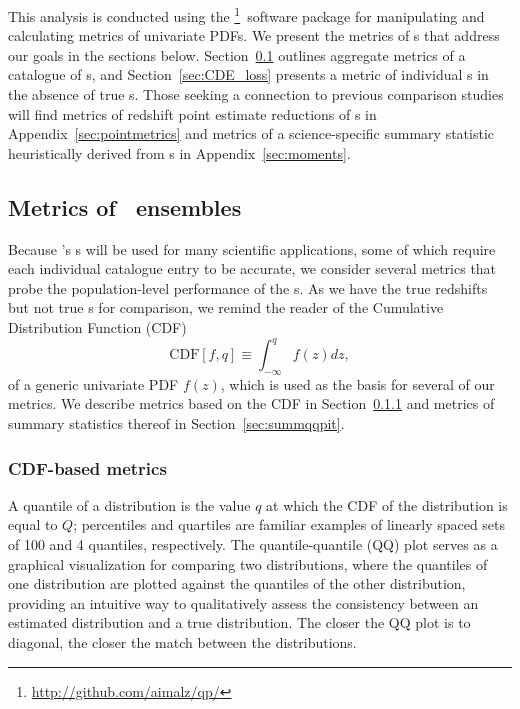 This analysis is conducted using the \qp\footnote{\url{http://github.com/aimalz/qp/}}\ software package \citep{Malz:qp} for manipulating and calculating metrics of univariate PDFs.
We present the metrics of \pzpdf s that address our goals in the sections below.
Section~\ref{sec:qualmet} outlines aggregate metrics of a catalogue of \pzpdf s, and Section~\ref{sec:CDE_loss} presents a metric of individual \pzpdf s in the absence of true \pzpdf s.
Those seeking a connection to previous comparison studies will find metrics of redshift point estimate reductions of \pzpdf s in Appendix~\ref{sec:pointmetrics} and metrics of a science-specific summary statistic heuristically derived from \pzpdf s in Appendix~\ref{sec:moments}.

\subsection{Metrics of \pzpdf \ ensembles}
\label{sec:qualmet}

Because \lsst's \pzpdf s will be used for many scientific applications, some of which require each individual catalogue entry to be accurate, we consider several metrics that probe the population-level performance of the \pzpdf s.
As we have the true redshifts but not true \pzpdf s for comparison, we remind the reader of the Cumulative Distribution Function (CDF)
\begin{equation}
  \label{eq:cdf}
  \mathrm{CDF}[f, q] \equiv \int_{-\infty}^{q} f(z) dz,
\end{equation}
of a generic univariate PDF $f(z)$, which is used as the basis for several of our metrics.
We describe metrics based on the CDF in Section~\ref{sec:qqpit} and metrics of summary statistics thereof in Section~\ref{sec:summqqpit}.

\subsubsection{CDF-based metrics}
\label{sec:qqpit}

A quantile of a distribution is the value $q$ at which the CDF of the distribution is equal to $Q$; percentiles and quartiles are familiar examples of linearly spaced sets of 100 and 4 quantiles, respectively.
The quantile-quantile (QQ) plot serves as a graphical visualization for comparing two distributions, where the quantiles of one distribution are plotted against the quantiles of the other distribution, providing an intuitive way to qualitatively assess the consistency between an estimated distribution and a true distribution.
The closer the QQ plot is to diagonal, the closer the match between the distributions.


